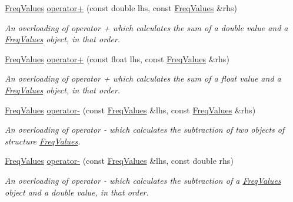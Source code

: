 \begin{DoxyCompactItemize}
\hyperlink{structFreqValues}{Freq\+Values} \hyperlink{structFreqValues_aac08336f88cf5e787fda3a6515f2b7ad}{operator+} (const double lhs, const \hyperlink{structFreqValues}{Freq\+Values} \&rhs)
\begin{DoxyCompactList}\small\item\em An overloading of operator + which calculates the sum of a {\itshape double} value and a {\itshape \hyperlink{structFreqValues}{Freq\+Values}} object, in that order. \end{DoxyCompactList}\item 
\mbox{\label{structFreqValues_add1a78bbae864d4a24ac7b491ae41b2e}} 
\hyperlink{structFreqValues}{Freq\+Values} \hyperlink{structFreqValues_add1a78bbae864d4a24ac7b491ae41b2e}{operator+} (const float lhs, const \hyperlink{structFreqValues}{Freq\+Values} \&rhs)
\begin{DoxyCompactList}\small\item\em An overloading of operator + which calculates the sum of a {\itshape float} value and a {\itshape \hyperlink{structFreqValues}{Freq\+Values}} object, in that order. \end{DoxyCompactList}\item 
\hyperlink{structFreqValues}{Freq\+Values} \hyperlink{structFreqValues_a05184c79e4dadc7a4e1f3a76fba1c3c8}{operator-\/} (const \hyperlink{structFreqValues}{Freq\+Values} \&lhs, const \hyperlink{structFreqValues}{Freq\+Values} \&rhs)
\begin{DoxyCompactList}\small\item\em An overloading of operator -\/ which calculates the subtraction of two objects of structure {\itshape \hyperlink{structFreqValues}{Freq\+Values}}. \end{DoxyCompactList}\item 
\hyperlink{structFreqValues}{Freq\+Values} \hyperlink{structFreqValues_ab6c8a27a2c665b80adfb29735d9040f4}{operator-\/} (const \hyperlink{structFreqValues}{Freq\+Values} \&lhs, const double rhs)
\begin{DoxyCompactList}\small\item\em An overloading of operator -\/ which calculates the subtraction of a {\itshape \hyperlink{structFreqValues}{Freq\+Values}} object and a {\itshape double} value, in that order. \end{DoxyCompactList}\item 
\mbox{\label{structFreqValues_ade558a5146a3dbea46f85e64d959ff3d}} 

\end{DoxyCompactItemize}
